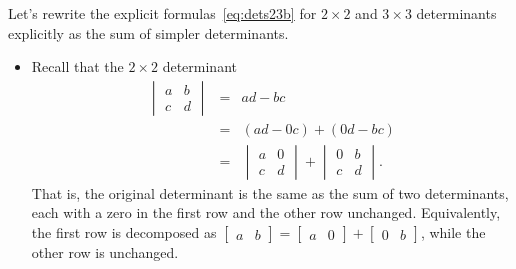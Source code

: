 \begin{example} \label{eg:}
Let's rewrite the explicit formulas~\eqref{eq:dets23b} for \(2\times2\) and \(3\times3\) determinants explicitly as the sum of simpler determinants.
\begin{itemize}
\item Recall that the \(2\times2\) determinant
\begin{eqnarray*}
\begin{vmatrix} a&b\\c&d \end{vmatrix}
&=&ad-bc
\\&=&(ad-0c)+(0d-bc)
\\&=&\begin{vmatrix} a&0\\c&d \end{vmatrix}
+\begin{vmatrix} 0&b\\c&d \end{vmatrix}.
\end{eqnarray*}
That is, the original determinant is the same as the sum of two determinants, each with a zero in the first row and the other row unchanged.
Equivalently, the first row is decomposed as \(\begin{bmatrix} a&b \end{bmatrix}=\begin{bmatrix} a&0 \end{bmatrix}+\begin{bmatrix} 0&b \end{bmatrix}\), while the other row is unchanged.


\end{itemize}
\end{example}
